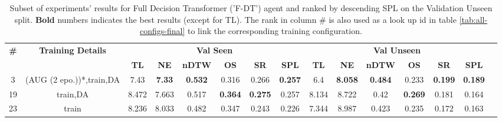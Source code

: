 \begin{table}
\centering
\caption{\label{tab:f_dt_final}Subset of experiments' results for Full Decision Transformer ('F-DT') agent and ranked by descending SPL on the Validation Unseen split. \textbf{Bold} numbers indicates the best results (except for TL). The rank in column \# is also used as a look up id in table \ref{tab:all-configs-final} to link the corresponding training configuration.}
\begin{tabular}{@{\hskip3pt}c@{\hskip3pt}c@{\hskip3pt}c@{\hskip3pt}c@{\hskip3pt}c@{\hskip3pt}c@{\hskip3pt}c@{\hskip3pt}c@{\hskip3pt}c@{\hskip3pt}c@{\hskip3pt}c@{\hskip3pt}c@{\hskip3pt}c@{\hskip3pt}c@{\hskip3pt}c}
\toprule
                                  \textbf{\#} & \textbf{Training Details} & \multicolumn{6}{c}{\textbf{Val Seen}} & \multicolumn{6}{c}{\textbf{Val Unseen}} \\
\cmidrule(l){3-8}\cmidrule(l){9-14}\textbf{~} &                \textbf{~} &       \textbf{TL} &    \textbf{NE} &   \textbf{nDTW} &     \textbf{OS} &     \textbf{SR} &    \textbf{SPL} &         \textbf{TL} &     \textbf{NE} &   \textbf{nDTW} &     \textbf{OS} &     \textbf{SR} &    \textbf{SPL} \\
\midrule
                                            3 &  (AUG (2 epo.))*,train,DA &              7.43 &  \textbf{7.33} &  \textbf{0.532} &           0.316 &           0.266 &  \textbf{0.257} &                 6.4 &  \textbf{8.058} &  \textbf{0.484} &           0.233 &  \textbf{0.199} &  \textbf{0.189} \\
                                           19 &                  train,DA &             8.472 &          7.663 &           0.517 &  \textbf{0.364} &  \textbf{0.275} &           0.257 &               8.134 &           8.722 &            0.42 &  \textbf{0.269} &           0.181 &           0.164 \\
                                           23 &                     train &             8.236 &          8.033 &           0.482 &           0.347 &           0.243 &           0.226 &               7.344 &           8.987 &           0.423 &           0.235 &           0.172 &           0.163 \\
\bottomrule
\end{tabular}
\end{table}
